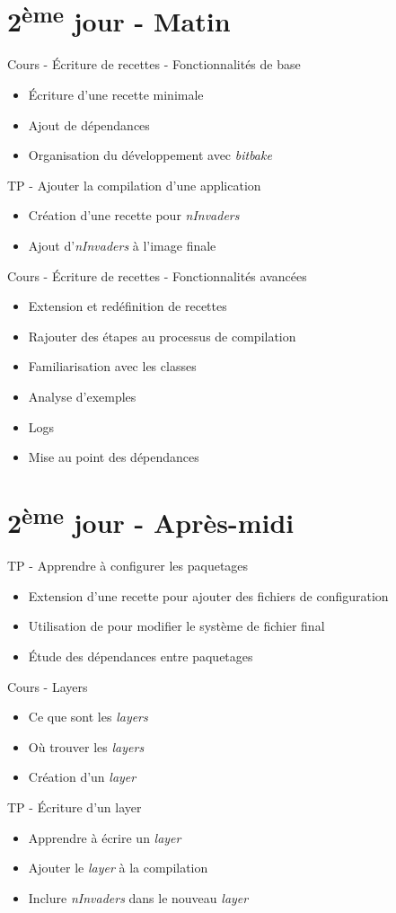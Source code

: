 \documentclass[a4paper,12pt,obeyspaces,spaces,hyphens]{article}
\begin{document}
\section{2\textsuperscript{ème} jour - Matin}

\feagendatwocolumn
{Cours - Écriture de recettes - Fonctionnalités de base}
{
  \begin{itemize}
  \item Écriture d'une recette minimale
  \item Ajout de dépendances
  \item Organisation du développement avec {\em bitbake}
  \end{itemize}
}
{TP - Ajouter la compilation d'une application}
{
  \begin{itemize}
  \item Création d'une recette pour {\em nInvaders}
  \item Ajout d'{\em nInvaders} à l'image finale
  \end{itemize}
}

\feagendaonecolumn
{Cours - Écriture de recettes - Fonctionnalités avancées}
{
  \begin{itemize}
  \item Extension et redéfinition de recettes
  \item Rajouter des étapes au processus de compilation
  \item Familiarisation avec les classes
  \item Analyse d'exemples
  \item Logs
  \item Mise au point des dépendances
  \end{itemize}
}

\section{2\textsuperscript{ème} jour - Après-midi}

\feagendaonecolumn
{TP - Apprendre à configurer les paquetages}
{
  \begin{itemize}
  \item Extension d'une recette pour ajouter des fichiers de configuration
  \item Utilisation de  pour modifier
        le système de fichier final
  \item Étude des dépendances entre paquetages
  \end{itemize}
}
\feagendatwocolumn
{Cours - Layers}
{
  \begin{itemize}
  \item Ce que sont les {\em layers}
  \item Où trouver les {\em layers}
  \item Création d'un {\em layer}
  \end{itemize}
}
{TP - Écriture d'un layer}
{
  \begin{itemize}
  \item Apprendre à écrire un {\em layer}
  \item Ajouter le {\em layer} à la compilation
  \item Inclure {\em nInvaders} dans le nouveau {\em layer}
  \end{itemize}
}
\end{document}
